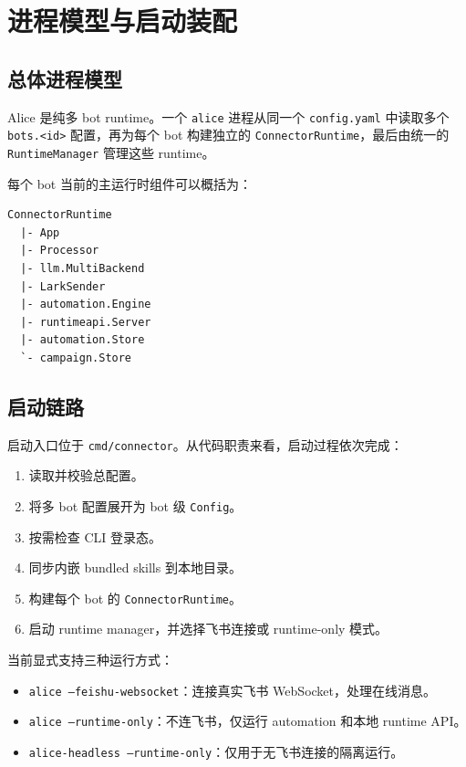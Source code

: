 \documentclass[12pt,a4paper]{ctexart}
\begin{document}
\section{进程模型与启动装配}

\subsection{总体进程模型}

Alice 是纯多 bot runtime。一个 \texttt{alice} 进程从同一个 \texttt{config.yaml} 中读取多个 \texttt{bots.<id>} 配置，再为每个 bot 构建独立的 \texttt{ConnectorRuntime}，最后由统一的 \texttt{RuntimeManager} 管理这些 runtime。

每个 bot 当前的主运行时组件可以概括为：

\begin{verbatim}
ConnectorRuntime
  |- App
  |- Processor
  |- llm.MultiBackend
  |- LarkSender
  |- automation.Engine
  |- runtimeapi.Server
  |- automation.Store
  `- campaign.Store
\end{verbatim}

\subsection{启动链路}

启动入口位于 \texttt{cmd/connector}。从代码职责来看，启动过程依次完成：

\begin{enumerate}
  \item 读取并校验总配置。
  \item 将多 bot 配置展开为 bot 级 \texttt{Config}。
  \item 按需检查 CLI 登录态。
  \item 同步内嵌 bundled skills 到本地目录。
  \item 构建每个 bot 的 \texttt{ConnectorRuntime}。
  \item 启动 runtime manager，并选择飞书连接或 runtime-only 模式。
\end{enumerate}

当前显式支持三种运行方式：

\begin{itemize}
  \item \texttt{alice --feishu-websocket}：连接真实飞书 WebSocket，处理在线消息。
  \item \texttt{alice --runtime-only}：不连飞书，仅运行 automation 和本地 runtime API。
  \item \texttt{alice-headless --runtime-only}：仅用于无飞书连接的隔离运行。
\end{itemize}
\end{document}

